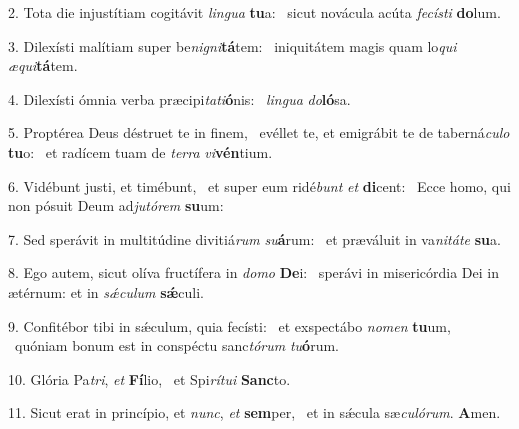 2. Tota die injustítiam cogitávit \textit{lin}\textit{gua} \textbf{tu}a: \ast\  sicut novácula acúta \textit{fe}\textit{cís}\textit{ti} \textbf{do}lum.\

3. Dilexísti malítiam super be\textit{ni}\textit{gni}\textbf{tá}tem: \ast\  iniquitátem magis quam lo\textit{qui} \textit{æ}\textit{qui}\textbf{tá}tem.\

4. Dilexísti ómnia verba præcipi\textit{ta}\textit{ti}\textbf{ó}nis: \ast\  \textit{lin}\textit{gua} \textit{do}\textbf{ló}sa.\

5. Proptérea Deus déstruet te in finem, \dag\  evéllet te, et emigrábit te de taberná\textit{cu}\textit{lo} \textbf{tu}o: \ast\  et radícem tuam de \textit{ter}\textit{ra} \textit{vi}\textbf{vén}tium.\

6. Vidébunt justi, et timébunt, \dag\  et super eum ridé\textit{bunt} \textit{et} \textbf{di}cent: \ast\  Ecce homo, qui non pósuit Deum ad\textit{ju}\textit{tó}\textit{rem} \textbf{su}um:\

7. Sed sperávit in multitúdine divitiá\textit{rum} \textit{su}\textbf{á}rum: \ast\  et præváluit in va\textit{ni}\textit{tá}\textit{te} \textbf{su}a.\

8. Ego autem, sicut olíva fructífera in \textit{do}\textit{mo} \textbf{De}i: \ast\  sperávi in misericórdia Dei in ætérnum: et in \textit{sǽ}\textit{cu}\textit{lum} \textbf{sǽ}culi.\

9. Confitébor tibi in sǽculum, quia fecísti: \dag\  et exspectábo \textit{no}\textit{men} \textbf{tu}um, \ast\  quóniam bonum est in conspéctu sanc\textit{tó}\textit{rum} \textit{tu}\textbf{ó}rum.\

10. Glória Pa\textit{tri}, \textit{et} \textbf{Fí}lio, \ast\  et Spi\textit{rí}\textit{tu}\textit{i} \textbf{Sanc}to.\

11. Sicut erat in princípio, et \textit{nunc}, \textit{et} \textbf{sem}per, \ast\  et in sǽcula sæ\textit{cu}\textit{ló}\textit{rum}. \textbf{A}men.\

